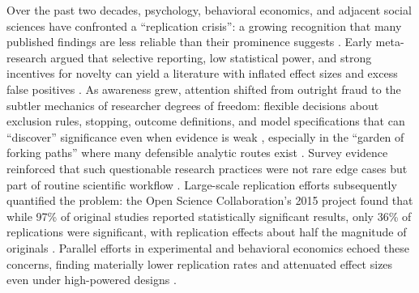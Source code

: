 \documentclass{article}
\theoremstyle{plain}
\theoremstyle{definition}
\theoremstyle{remark}
\begin{document}
Over the past two decades, psychology, behavioral economics, and adjacent social sciences have confronted a “replication crisis”: a growing recognition that many published findings are less reliable than their prominence suggests \citep{opensciencecollaboration2015reproducibility,camerer2016evaluating,camerer2018evaluating}. Early meta-research argued that selective reporting, low statistical power, and strong incentives for novelty can yield a literature with inflated effect sizes and excess false positives \citep{ioannidis2005why,button2013power}. As awareness grew, attention shifted from outright fraud to the subtler mechanics of researcher degrees of freedom: flexible decisions about exclusion rules, stopping, outcome definitions, and model specifications that can “discover” significance even when evidence is weak \citep{simmons2011falsepositive}, especially in the “garden of forking paths” where many defensible analytic routes exist \citep{gelman2013forkingpaths}. Survey evidence reinforced that such questionable research practices were not rare edge cases but part of routine scientific workflow \citep{john2012measuring}. Large-scale replication efforts subsequently quantified the problem: the Open Science Collaboration’s 2015 project found that while 97\% of original studies reported statistically significant results, only 36\% of replications were significant, with replication effects about half the magnitude of originals \citep{opensciencecollaboration2015reproducibility}. Parallel efforts in experimental and behavioral economics echoed these concerns, finding materially lower replication rates and attenuated effect sizes even under high-powered designs \citep{camerer2016evaluating,camerer2018evaluating}.
\end{document}
